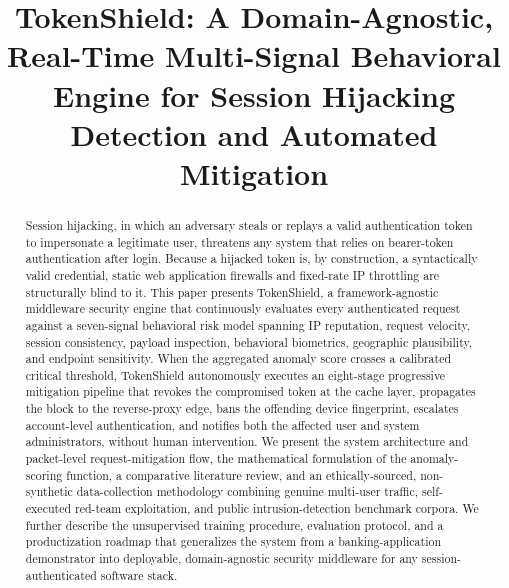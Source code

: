 \documentclass[conference]{IEEEtran}
\begin{document}
\title{TokenShield: A Domain-Agnostic, Real-Time Multi-Signal Behavioral Engine for Session Hijacking Detection and Automated Mitigation}

\author{
}

\maketitle

\begin{abstract}
Session hijacking, in which an adversary steals or replays a valid authentication token to impersonate a legitimate user, threatens any system that relies on bearer-token authentication after login. Because a hijacked token is, by construction, a syntactically valid credential, static web application firewalls and fixed-rate IP throttling are structurally blind to it. This paper presents TokenShield, a framework-agnostic middleware security engine that continuously evaluates every authenticated request against a seven-signal behavioral risk model spanning IP reputation, request velocity, session consistency, payload inspection, behavioral biometrics, geographic plausibility, and endpoint sensitivity. When the aggregated anomaly score crosses a calibrated critical threshold, TokenShield autonomously executes an eight-stage progressive mitigation pipeline that revokes the compromised token at the cache layer, propagates the block to the reverse-proxy edge, bans the offending device fingerprint, escalates account-level authentication, and notifies both the affected user and system administrators, without human intervention. We present the system architecture and packet-level request-mitigation flow, the mathematical formulation of the anomaly-scoring function, a comparative literature review, and an ethically-sourced, non-synthetic data-collection methodology combining genuine multi-user traffic, self-executed red-team exploitation, and public intrusion-detection benchmark corpora. We further describe the unsupervised training procedure, evaluation protocol, and a productization roadmap that generalizes the system from a banking-application demonstrator into deployable, domain-agnostic security middleware for any session-authenticated software stack.
\end{abstract}
\end{document}

